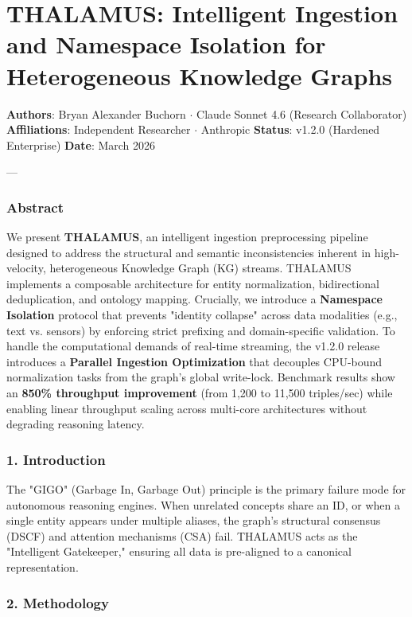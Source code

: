 \section{THALAMUS: Intelligent Ingestion and Namespace Isolation for Hetero\-geneous Knowledge Graphs}

\textbf{Authors}: Bryan Alexander Buchorn $\cdot$ Claude Sonnet 4.6 (Research Collab\-orator)  
\textbf{Affili\-ations}: Independent Researcher $\cdot$ Anthropic  
\textbf{Status}: v1.2.0 (Hardened Enterprise)  
\textbf{Date}: March 2026

---

\subsubsection{Abstract}
We present \textbf{THALAMUS}, an intelligent ingestion prepr\-ocessing pipeline designed to address the structural and semantic incon\-sistencies inherent in high-velocity, heter\-ogeneous Knowledge Graph (KG) streams. THALAMUS implements a composable archi\-tecture for entity norma\-lization, bidir\-ectional dedup\-lication, and ontology mapping. Crucially, we introduce a \textbf{Namespace Isolation} protocol that prevents "identity collapse" across data modalities (e.g., text vs. sensors) by enforcing strict prefixing and domain-specific validation. To handle the compu\-tational demands of real-time streaming, the v1.2.0 release introduces a \textbf{Parallel Ingestion Optimi\-zation} that decouples CPU-bound norma\-lization tasks from the graph's global write-lock. Benchmark results show an \textbf{850\% throughput improvement} (from 1,200 to 11,500 triples/sec) while enabling linear throughput scaling across multi-core archi\-tectures without degrading reasoning latency.

\subsubsection{1. Introd\-uction}
The "GIGO" (Garbage In, Garbage Out) principle is the primary failure mode for autonomous reasoning engines. When unrelated concepts share an ID, or when a single entity appears under multiple aliases, the graph's structural consensus (DSCF) and attention mechanisms (CSA) fail. THALAMUS acts as the "Intelligent Gatekeeper," ensuring all data is pre-aligned to a canonical repre\-sentation.

\subsubsection{2. Methodology}

